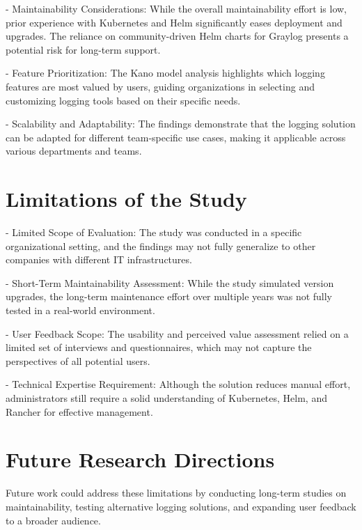 \documentclass[../main.tex]{subfiles}
\begin{document}
- Maintainability Considerations: While the overall maintainability effort is low, prior experience with Kubernetes and Helm significantly eases deployment and upgrades. The reliance on community-driven Helm charts for Graylog presents a potential risk for long-term support.

- Feature Prioritization: The Kano model analysis highlights which logging features are most valued by users, guiding organizations in selecting and customizing logging tools based on their specific needs.  

- Scalability and Adaptability: The findings demonstrate that the logging solution can be adapted for different team-specific use cases, making it applicable across various departments and teams.  

\section{Limitations of the Study}

- Limited Scope of Evaluation: The study was conducted in a specific organizational setting, and the findings may not fully generalize to other companies with different IT infrastructures. 

- Short-Term Maintainability Assessment: While the study simulated version upgrades, the long-term maintenance effort over multiple years was not fully tested in a real-world environment.

- User Feedback Scope: The usability and perceived value assessment relied on a limited set of interviews and questionnaires, which may not capture the perspectives of all potential users.

- Technical Expertise Requirement: Although the solution reduces manual effort, administrators still require a solid understanding of Kubernetes, Helm, and Rancher for effective management.  

\section{Future Research Directions}

Future work could address these limitations by conducting long-term studies on maintainability, testing alternative logging solutions, and expanding user feedback to a broader audience.  
\end{document}
